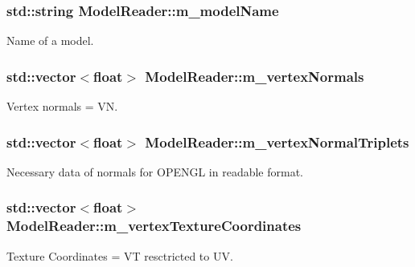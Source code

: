 \subsubsection[{\texorpdfstring{m\+\_\+model\+Name}{m_modelName}}]{\setlength{\rightskip}{0pt plus 5cm}std\+::string Model\+Reader\+::m\+\_\+model\+Name\hspace{0.3cm}{\ttfamily [private]}}\hypertarget{class_model_reader_a5adca8aa3aeda91670b3d5d080165b2f}{}\label{class_model_reader_a5adca8aa3aeda91670b3d5d080165b2f}
Name of a model. 
\subsubsection[{\texorpdfstring{m\+\_\+vertex\+Normals}{m_vertexNormals}}]{\setlength{\rightskip}{0pt plus 5cm}std\+::vector$<$float$>$ Model\+Reader\+::m\+\_\+vertex\+Normals\hspace{0.3cm}{\ttfamily [private]}}\hypertarget{class_model_reader_adaf9095e7b9d76761142e1addcb7b203}{}\label{class_model_reader_adaf9095e7b9d76761142e1addcb7b203}
Vertex normals = VN. 
\subsubsection[{\texorpdfstring{m\+\_\+vertex\+Normal\+Triplets}{m_vertexNormalTriplets}}]{\setlength{\rightskip}{0pt plus 5cm}std\+::vector$<$float$>$ Model\+Reader\+::m\+\_\+vertex\+Normal\+Triplets\hspace{0.3cm}{\ttfamily [private]}}\hypertarget{class_model_reader_ac53d337835121e29acf367aee4e4d407}{}\label{class_model_reader_ac53d337835121e29acf367aee4e4d407}
Necessary data of normals for O\+P\+E\+N\+GL in readable format. 
\subsubsection[{\texorpdfstring{m\+\_\+vertex\+Texture\+Coordinates}{m_vertexTextureCoordinates}}]{\setlength{\rightskip}{0pt plus 5cm}std\+::vector$<$float$>$ Model\+Reader\+::m\+\_\+vertex\+Texture\+Coordinates\hspace{0.3cm}{\ttfamily [private]}}\hypertarget{class_model_reader_a650f9b20143951a5baa47d35b6b069ce}{}\label{class_model_reader_a650f9b20143951a5baa47d35b6b069ce}
Texture Coordinates = VT resctricted to UV. 
